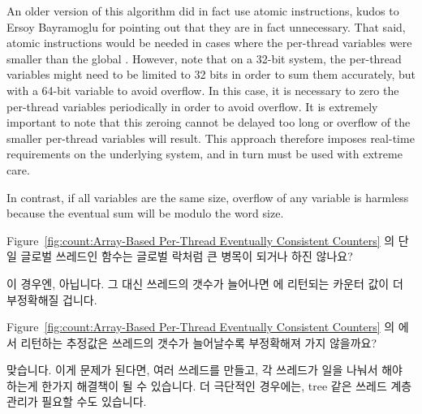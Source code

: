 \begin{enumerate}
	An older version of this algorithm did in fact use atomic
	instructions, kudos to Ersoy Bayramoglu for pointing out that
	they are in fact unnecessary.
	That said, atomic instructions would be needed in cases where
	the per-thread  variables were smaller than the
	global .
	However, note that on a 32-bit system,
	the per-thread  variables
	might need to be limited to 32 bits in order to sum them accurately,
	but with a 64-bit  variable to avoid overflow.
	In this case, it is necessary to zero the per-thread
	 variables periodically in order to avoid overflow.
	It is extremely important to note that this zeroing cannot
	be delayed too long or overflow of the smaller per-thread
	variables will result.
	This approach therefore imposes real-time requirements on the
	underlying system, and in turn must be used with extreme care.

	In contrast, if all variables are the same size, overflow
	of any variable is harmless because the eventual sum
	will be modulo the word size.
	\fi

\QuickQ{}
	Figure~\ref{fig:count:Array-Based Per-Thread Eventually Consistent
	Counters} 의 단일 글로벌 쓰레드인  함수는 글로벌 락처럼
	큰 병목이 되거나 하진 않나요?

\QuickA{}
	이 경우엔, 아닙니다.
	그 대신 쓰레드의 갯수가 늘어나면  에 리턴되는 카운터
	값이 더 부정확해질 겁니다.

\QuickQ{}
	Figure~\ref{fig:count:Array-Based Per-Thread Eventually Consistent
	Counters} 의  에서 리턴하는 추정값은 쓰레드의 갯수가
	늘어날수록 부정확해져 가지 않을까요?

\QuickA{}
	맞습니다.
	이게 문제가 된다면, 여러  쓰레드를 만들고, 각 쓰레드가
	일을 나눠서 해야 하는게 한가지 해결책이 될 수 있습니다.
	더 극단적인 경우에는, tree 같은  쓰레드 계층 관리가
	필요할 수도 있습니다.
	\iffalse


\end{enumerate}
